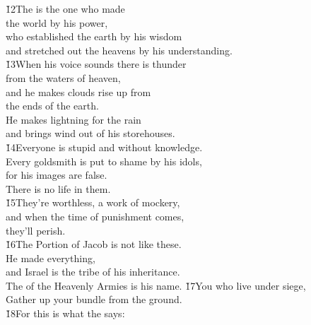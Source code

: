 \begin{poetry}
\poeml \v{12}The  is the one who made \\
\poemll    the world by his power, \\
\poeml who established the earth by his wisdom \\
\poemll    and stretched out the heavens by his understanding. \\
\poeml \v{13}When his voice sounds there is thunder \\
\poemll    from the waters of heaven, \\
\poeml and he makes clouds rise up from \\
\poemll    the ends of the earth. \\
\poeml He makes lightning for the rain \\
\poemll    and brings wind out of his storehouses. \\
\poeml \v{14}Everyone is stupid and without knowledge. \\
\poemll    Every goldsmith is put to shame by his idols, \\
\poemlll       for his images are false. \\
\poeml There is no life in them. \\
\poeml \v{15}They're worthless, a work of mockery, \\
\poemll    and when the time of punishment comes, \\
\poemlll       they'll perish. \\
\poeml \v{16}The Portion of Jacob is not like these. \\
\poemll    He made everything, \\
\poeml and Israel is the tribe of his inheritance. \\
\poemll    The  of the Heavenly Armies is his name.
\poeml \v{17}You who live under siege, \\
\poemll    Gather up your bundle from the ground. \\
\poeml \v{18}For this is what the  says: \\

\end{poetry}
